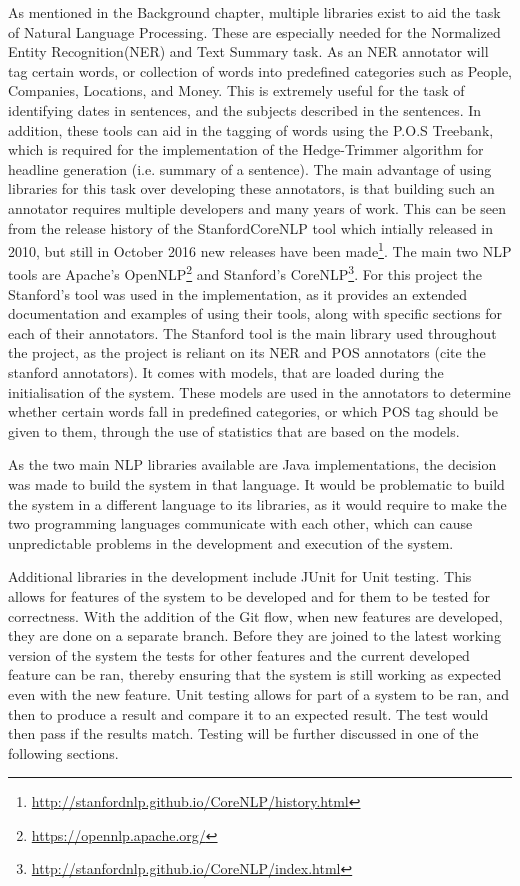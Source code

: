 \par As mentioned in the Background chapter, multiple libraries exist to aid the task of Natural Language Processing. These are especially needed for the Normalized Entity Recognition(NER) and Text Summary task. As an NER annotator will tag certain words, or collection of words into predefined categories such as People, Companies, Locations, and Money. This is extremely useful for the task of identifying dates in sentences, and the subjects described in the sentences. In addition, these tools can aid in the tagging of words using the P.O.S Treebank, which is required for the implementation of the Hedge-Trimmer algorithm \cite{dorrzajicschwartz2003} for headline generation (i.e. summary of a sentence). The main advantage of using libraries for this task over developing these annotators, is that building such an annotator requires multiple developers and many years of work. This can be seen from the 	release history of the StanfordCoreNLP tool which intially released in 2010, but still in October 2016 new releases have been made\footnote{\url{http://stanfordnlp.github.io/CoreNLP/history.html}}. The main two NLP tools are Apache's OpenNLP\footnote{\url{https://opennlp.apache.org/}} and Stanford's CoreNLP\footnote{\url{http://stanfordnlp.github.io/CoreNLP/index.html}}. For this project the Stanford's tool was used in the implementation, as it provides an extended documentation and examples of using their tools, along with specific sections for each of their annotators. The Stanford tool is the main library used throughout the project, as the project is reliant on its NER and POS annotators (cite the stanford annotators). It comes with models, that are loaded during the initialisation of the system. These models are used in the annotators to determine whether certain words fall in predefined categories, or which POS tag should be given to them, through the use of statistics that are based on the models. 
\par As the two main NLP libraries available are Java implementations, the decision was made to build the system in that language. It would be problematic to build the system in a different language to its libraries, as it would require to make the two programming languages communicate with each other, which can cause unpredictable problems in the development and execution of the system.
\par Additional libraries in the development include JUnit for Unit testing. This allows for features of the system to be developed and for them to be tested for correctness. With the addition of the Git flow, when new features are developed, they are done on a separate branch. Before they are joined to the latest working version of the system the tests for other features and the current developed feature can be ran, thereby ensuring that the system is still working as expected even with the new feature. Unit testing allows for part of a system to be ran, and then to produce a result and compare it to an expected result. The test would then pass if the results match. Testing will be further discussed in one of the following sections.

